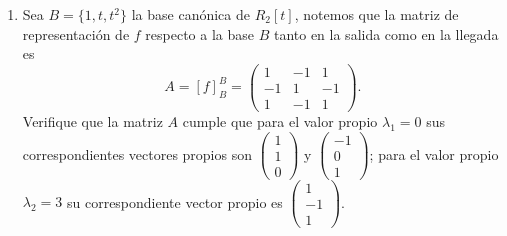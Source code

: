 \documentclass[10pt,a4]{examenEPN}
\begin{document}
\begin{preguntas}
\begin{respuesta}
\begin{enumerate}
    Para el valor propio $\lambda_{2} = 1$ se verifica que 
    \[
        [f(v_{2})]_{B} = \lambda_{2}[v_{2}]_{B}
        \texty
        [f(v_{3})]_{B} = \lambda_{2}[v_{3}]_{B}
    \]
    donde
    \[
        [v_{2}]_{B} = \begin{pmatrix}1\\0\\1\\0\end{pmatrix}
        \texty
        [v_{3}]_{B} = \begin{pmatrix}0\\1\\0\\1\end{pmatrix}
    \]
    de lo cual
    \[
        v_{2} = \begin{pmatrix}1&0\\1&0\end{pmatrix}
        \texty
        v_{3} = \begin{pmatrix}0&1\\0&1\end{pmatrix}
    \]
    
    Finalmente, para el valor propio $\lambda_{3} = 2$ se verifica que 
    \[
        [f(v_{4})]_{B} = \lambda_{3}[v_{4}]_{B}
    \]
    donde
    \[
        [v_{4}]_{B} = \begin{pmatrix}-1\\0\\0\\1\end{pmatrix}
    \]
    de lo cual
    \[
        v_{4} = \begin{pmatrix}-1&0\\0&1\end{pmatrix}.
    \]
    \item Sea $B = \{1, t, t^{2}\}$ la base canónica de $R_{2}[t]$, notemos que la matriz de representación de $f$ respecto a la base $B$ tanto en la salida como en la llegada es
    \[
        A = [f]_{B}^{B} = \begin{pmatrix}1&-1&1\\-1&1&-1\\1&-1&1\end{pmatrix}.
    \]
    Verifique que la matriz $A$ cumple que para el valor propio $\lambda_{1} = 0$ sus correspondientes vectores propios son $\begin{pmatrix}1\\1\\0\end{pmatrix}$ y $\begin{pmatrix}-1\\0\\1\end{pmatrix}$; para el valor propio $\lambda_{2} = 3$ su correspondiente vector propio es $\begin{pmatrix}1\\-1\\1\end{pmatrix}$.
    

\end{enumerate}
\end{respuesta}
\end{preguntas}
\end{document}

